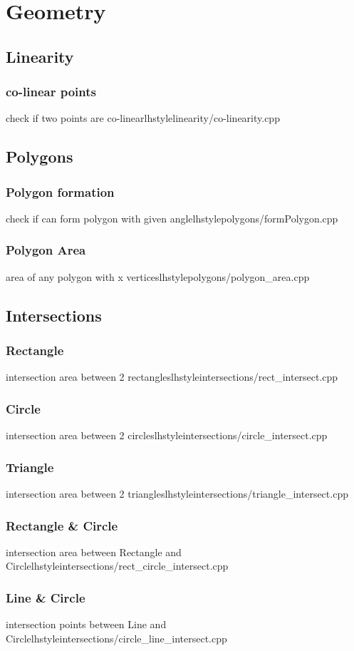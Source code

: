\section{Geometry}
    \subsection{Linearity}
        \subsubsection{co-linear points}
           {check if two points are co-linear}{lhstyle}{linearity/co-linearity.cpp}
    \subsection{Polygons}
        \subsubsection{Polygon formation}
           {check if can form polygon with given angle}{lhstyle}{polygons/formPolygon.cpp}
        \subsubsection{Polygon Area}
           {area of any polygon with x vertices}{lhstyle}{polygons/polygon_area.cpp}
    \subsection{Intersections}
        \subsubsection{Rectangle}
           {intersection area between 2 rectangles}{lhstyle}{intersections/rect_intersect.cpp}
        \subsubsection{Circle}
           {intersection area between 2 circles}{lhstyle}{intersections/circle_intersect.cpp}
        \subsubsection{Triangle}
           {intersection area between 2 triangles}{lhstyle}{intersections/triangle_intersect.cpp}
        \subsubsection{Rectangle & Circle}
           {intersection area between Rectangle and Circle}{lhstyle}{intersections/rect_circle_intersect.cpp}
        \subsubsection{Line & Circle}
           {intersection points between Line and Circle}{lhstyle}{intersections/circle_line_intersect.cpp}

